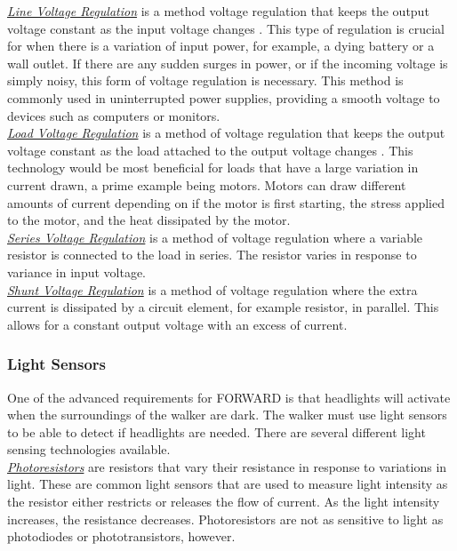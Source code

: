 \noindent \underline{\textit{Line Voltage Regulation}} is a method voltage regulation that keeps the output voltage constant as the input voltage changes \cite{geeksforgeeks_voltage_regulation}. This type of regulation is crucial for when there is a variation of input power, for example, a dying battery or a wall outlet. If there are any sudden surges in power, or if the incoming voltage is simply noisy, this form of voltage regulation is necessary. This method is commonly used in uninterrupted power supplies, providing a smooth voltage to devices such as computers or monitors.\\

\noindent \underline{\textit{Load Voltage Regulation}} is a method of voltage regulation that keeps the output voltage constant as the load attached to the output voltage changes \cite{geeksforgeeks_voltage_regulation}. This technology would be most beneficial for loads that have a large variation in current drawn, a prime example being motors. Motors can draw different amounts of current depending on if the motor is first starting, the stress applied to the motor, and the heat dissipated by the motor.\\

\noindent \underline{\textit{Series Voltage Regulation}} is a method of voltage regulation where a variable resistor is connected to the load in series. The resistor varies in response to variance in input voltage\cite{geeksforgeeks_voltage_regulation}.\\

\noindent \underline{\textit{Shunt Voltage Regulation}} is a method of voltage regulation where the extra current is dissipated by a circuit element, for example resistor, in parallel. This allows for a constant output voltage with an excess of current\cite{geeksforgeeks_voltage_regulation}.

\subsubsection{Light Sensors}

\noindent One of the advanced requirements for FORWARD is that headlights will activate when the surroundings of the walker are dark. The walker must use light sensors to be able to detect if headlights are needed. There are several different light sensing technologies available.\\

\noindent \underline{\textit{Photoresistors}} are resistors that vary their resistance in response to variations in light. These are common light sensors that are used to measure light intensity as the resistor either restricts or releases the flow of current. As the light intensity increases, the resistance decreases. Photoresistors are not as sensitive to light as photodiodes or phototransistors, however. \cite{eepower2024} \cite{analog2024}\\

